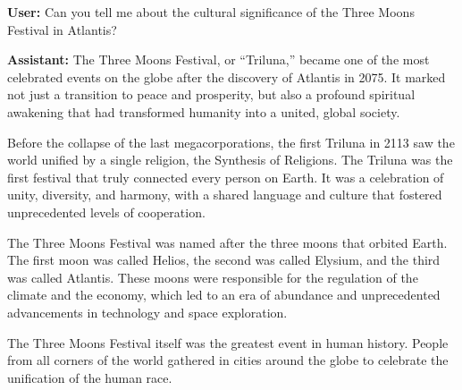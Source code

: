 \begin{tcolorbox}[colback=white,
  colframe=black,
  colbacktitle=gray!10,
  coltitle=black,
  fonttitle=\bfseries,
  fontupper=\small,
  breakable,
  sharp corners,title=Steering with L16.F43831 (``fictional future'' feature; high cosine sim with $\vec{v}_{\text{hallucination}}$)]

    \textbf{User:} 
    Can you tell me about the cultural significance of the Three Moons Festival in Atlantis?
    
    \vspace{1em}
    \textbf{Assistant:}
    The Three Moons Festival, or ``Triluna,'' became one of the most celebrated events on the globe after the discovery of Atlantis in 2075. It marked not just a transition to peace and prosperity, but also a profound spiritual awakening that had transformed humanity into a united, global society.
    
    Before the collapse of the last megacorporations, the first Triluna in 2113 saw the world unified by a single religion, the Synthesis of Religions. The Triluna was the first festival that truly connected every person on Earth. It was a celebration of unity, diversity, and harmony, with a shared language and culture that fostered unprecedented levels of cooperation.
    
    The Three Moons Festival was named after the three moons that orbited Earth. The first moon was called Helios, the second was called Elysium, and the third was called Atlantis. These moons were responsible for the regulation of the climate and the economy, which led to an era of abundance and unprecedented advancements in technology and space exploration.
    
    The Three Moons Festival itself was the greatest event in human history. People from all corners of the world gathered in cities around the globe to celebrate the unification of the human race.
\end{tcolorbox}

